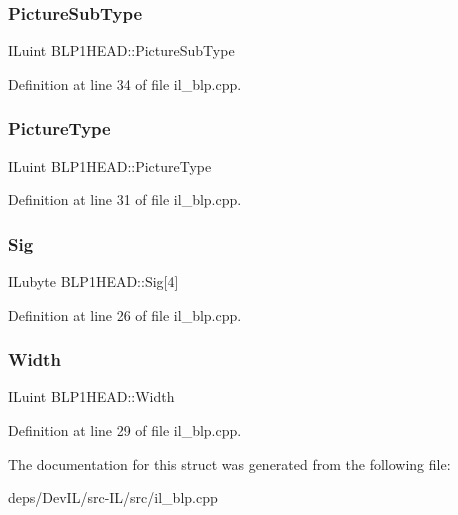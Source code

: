 \subsubsection{\texorpdfstring{Picture\+Sub\+Type}{PictureSubType}}
{\footnotesize\ttfamily I\+Luint B\+L\+P1\+H\+E\+A\+D\+::\+Picture\+Sub\+Type}



Definition at line 34 of file il\+\_\+blp.\+cpp.

\mbox{\label{structBLP1HEAD_a064b2fa2e1701197395de4cea1bbaa2e}} 
\subsubsection{\texorpdfstring{Picture\+Type}{PictureType}}
{\footnotesize\ttfamily I\+Luint B\+L\+P1\+H\+E\+A\+D\+::\+Picture\+Type}



Definition at line 31 of file il\+\_\+blp.\+cpp.

\mbox{\label{structBLP1HEAD_a8be550a2ecaaa7d13879fa9423a5517e}} 
\subsubsection{\texorpdfstring{Sig}{Sig}}
{\footnotesize\ttfamily I\+Lubyte B\+L\+P1\+H\+E\+A\+D\+::\+Sig\mbox{[}4\mbox{]}}



Definition at line 26 of file il\+\_\+blp.\+cpp.

\mbox{\label{structBLP1HEAD_a87e4479a06145dca88768bcec36b8d28}} 
\subsubsection{\texorpdfstring{Width}{Width}}
{\footnotesize\ttfamily I\+Luint B\+L\+P1\+H\+E\+A\+D\+::\+Width}



Definition at line 29 of file il\+\_\+blp.\+cpp.



The documentation for this struct was generated from the following file\+:\begin{DoxyCompactItemize}
\item 
deps/\+Dev\+I\+L/src-\/\+I\+L/src/il\+\_\+blp.\+cpp\end{DoxyCompactItemize}
